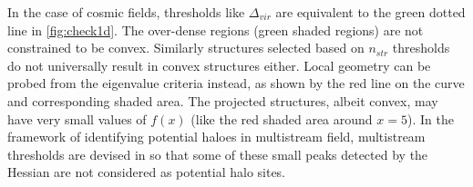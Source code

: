 In the case of cosmic fields, thresholds like $\Delta_{vir}$ are equivalent to the green dotted line in \autoref{fig:check1d}. The over-dense regions (green shaded regions) are not constrained to be convex. Similarly structures selected based on $n_{str}$ thresholds do not universally result in convex structures either. Local geometry can be probed from the eigenvalue criteria instead, as shown by the red line on the curve and corresponding shaded area. The projected structures, albeit convex, may have very small values of $f(x)$ (like the red shaded area around $x=5$). In the framework of identifying potential haloes in multistream field, multistream thresholds are devised in so that some of these small peaks detected by the Hessian are not considered as potential halo sites.

